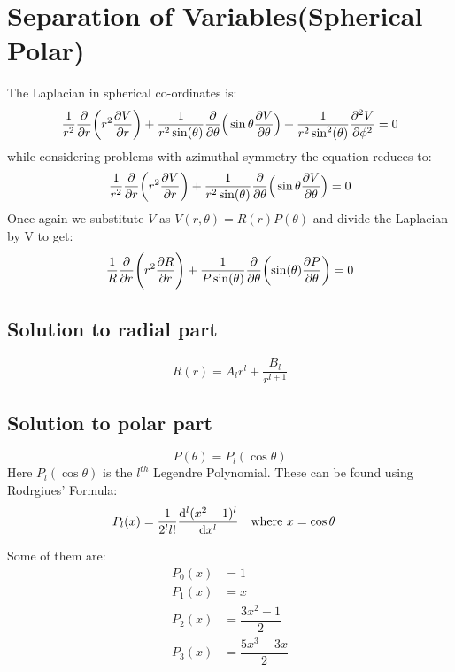 \documentclass[12pt, oneside]{book}
\begin{document}
\section{Separation of Variables(Spherical Polar)}
The Laplacian in spherical co-ordinates is:
\begin{equation}
	\frac{1}{r^2} \pdv{r}(r^2 \pdv{V}{r}) + \dfrac{1}{r^2 \sin(\theta)} \pdv{\theta}\Big(\sin\theta \pdv{V}{\theta}\Big) + \dfrac{1}{r^2 \sin[2](\theta)}\pdv[2]{V}{\phi} =0
\end{equation}
while considering problems with azimuthal symmetry the equation reduces to:
\begin{equation}
	\frac{1}{r^2} \pdv{r}(r^2 \pdv{V}{r}) + \dfrac{1}{r^2 \sin(\theta)} \pdv{\theta}\Big(\sin\theta \pdv{V}{\theta}\Big)=0
\end{equation}
Once again we substitute $V$ as $V(r,\theta)=R(r)P(\theta)$ and divide the Laplacian by V to get:
\begin{equation}
	\frac{1}{R}\pdv{r}\Bigg(r^2\pdv{R}{r}\Bigg) + \frac{1}{P \sin(\theta)}\pdv{\theta}(\sin(\theta)\pdv{P}{\theta})=0
\end{equation}

\subsection{Solution to radial part}
\begin{equation}
	R(r)=A_l r^l+\dfrac{B_l}{r^{l+1}}
\end{equation}

\subsection{Solution to polar part}
\begin{equation}
	P(\theta)=P_l(\cos\theta)
\end{equation}
Here $P_l(\cos\theta)$ is the $l^{th}$ Legendre Polynomial. These can be found using Rodrgiues' Formula:
\begin{equation}
	P_l(x)=\dfrac{1}{2^l l!}\dv[l]{(x^2-1)^l}{x} \qq{where $x=\cos\theta$}
\end{equation}

Some of them are:
\begin{align*}
	P_0(x)&=1\\
	P_1(x)&=x \\
	P_2(x)&=\dfrac{3x^2-1}{2}\\
	P_3(x)&=\dfrac{5x^3-3x}{2}
\end{align*}
\end{document}
